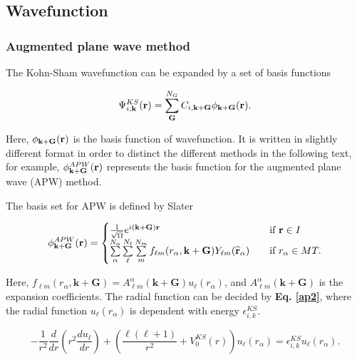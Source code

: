 \documentclass[a4paper, 12pt, titlepage,oneside,drop]{kthesis}
\begin{document}
\subsection{Wavefunction}
\subsubsection{Augmented plane wave method}

The Kohn-Sham wavefunction can be expanded by a set of basis functions 

\begin{equation}\label{wavefunctions}
 \Psi^{KS}_{i,\textbf{k}}(\textbf{r}) = \sum\limits_{\textbf{G}}^{N_G} C_{i,\textbf{k}+\textbf{G}}\phi_{\textbf {k}+\textbf{G}} ({\textbf r}).
\end{equation}

Here, $\phi_{\textbf {k}+\textbf{G}} ({\textbf r})$ is the basis function of wavefunction. It is written in slightly different format in order to distinct the different methods in the following text, for example, 
$\phi^{APW}_{\textbf {k}+\textbf{G}}({\textbf r})$ represents the basis function for the augmented plane wave (APW) method.

The basis set for APW is defined by Slater

\begin{equation}\label{ap111}
\phi^{APW}_{\textbf {k}+\textbf{G}} ({\textbf r}) = 
\begin{cases} \frac {1}{\sqrt{\Omega}} e^{i({ \textbf {k}+\textbf{G}}) {\textbf r}} & \quad \mbox{if ${\textbf r} \in I $} 
\\
\sum\limits_{\alpha}^{N_{\alpha}} \sum\limits_{{\ell}}^{N_{\ell}} \sum\limits_{{m}}^{N_{m}} f_{{\ell}{m}} (r_{\alpha},{\textbf {k}+\textbf{G}}) Y_{{\ell}m}(\widehat{{\textbf r}}_{\alpha})  & \quad \mbox{if $ r_{\alpha} \in MT. $}\\ 
\end{cases}
\end{equation}

Here, $f_{{\ell}{m}} (r_{\alpha},\textbf{k}+\textbf{G}) =  A _{{\ell}m}^{\alpha} ( \textbf {k}+\textbf{G}) u_{{\ell}}(r_{\alpha})$, and $A _{{\ell}m}^{\alpha} (\textbf {k}+\textbf{G}) $ is the 
expansion coefficients. The radial function can be decided by \textbf{Eq. \ref{ap2}}, where the radial function $u_{{\ell}} (r_{\alpha})$ is dependent with energy $\epsilon_{i,k}^{KS}$.

\begin{equation}\label{ap2}
-\frac{1}{r^2}  \frac{d}{dr} (r^2 \frac{du_{\ell}}{dr})+ \left(\frac{\ell(\ell+1)}{r^2}+V^{KS}_0({r})\right)u_{\ell}(r_{\alpha}) = \epsilon_{i,k}^{KS} u_{\ell}(r_{\alpha}).
\end{equation}
\end{document}

